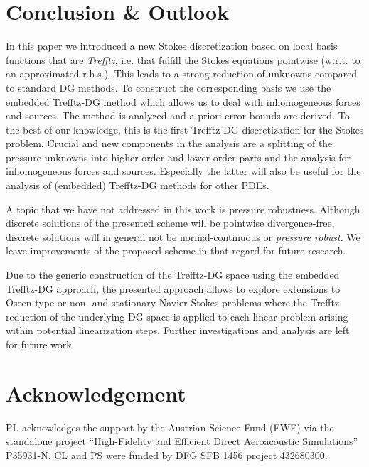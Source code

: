\documentclass[pdflatex,sn-mathphys,Numbered]{sn-jnl}%
\theoremstyle{remark}%
\theoremstyle{definition}%
\begin{document}
\section{Conclusion \& Outlook}\label{sec13} In this paper we
introduced a new Stokes discretization based on local basis functions
that are \emph{Trefftz}, i.e. that fulfill the Stokes equations
pointwise (w.r.t. to an approximated r.h.s.). This leads to a strong
reduction of unknowns compared to standard DG methods. To construct
the corresponding basis we use the embedded Trefftz-DG method which allows us to deal with inhomogeneous forces and sources. The method
is analyzed and a priori error bounds are derived. To the best of our
knowledge, this is the first Trefftz-DG discretization for the Stokes
problem. Crucial and new components in the analysis are a splitting of
the pressure unknowns into higher order and lower order parts and the
analysis for inhomogeneous forces and sources. Especially the latter
will also be useful for the analysis of (embedded) Trefftz-DG methods
for other PDEs. 

A topic that we have not addressed in this work is pressure robustness. Although discrete solutions of the presented scheme will be pointwise divergence-free, discrete solutions will in general not be normal-continuous or \emph{pressure robust}. We leave improvements of the proposed scheme in that regard for future research.

Due to the generic construction of the Trefftz-DG space using the embedded Trefftz-DG approach, the presented approach allows to explore extensions to Oseen-type or non- and stationary Navier-Stokes problems where the Trefftz reduction of the underlying DG space is applied to each linear problem arising within potential linearization steps. Further investigations and analysis are left for future work.
\section{Acknowledgement}

PL acknowledges the support by the Austrian Science Fund (FWF) via the
standalone project “High-Fidelity and Efficient Direct Aeroacoustic
Simulations” P35931-N. CL and PS were funded by DFG SFB 1456 project 432680300.
\end{document}
